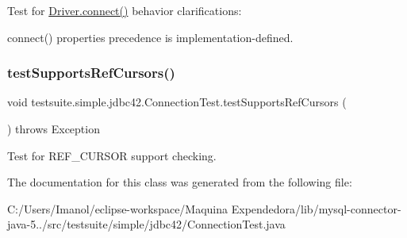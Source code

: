 Test for \mbox{\hyperlink{classcom_1_1mysql_1_1jdbc_1_1_non_registering_driver_a834c012e752a01d1ee435b3461bb8218}{Driver.\+connect()}} behavior clarifications\+:
\begin{DoxyItemize}
\item connect() properties precedence is implementation-\/defined. 
\end{DoxyItemize}\mbox{\label{classtestsuite_1_1simple_1_1jdbc42_1_1_connection_test_a428df5ce2ff1a22453a331c63e6802e5}} 
\subsubsection{\texorpdfstring{test\+Supports\+Ref\+Cursors()}{testSupportsRefCursors()}}
{\footnotesize\ttfamily void testsuite.\+simple.\+jdbc42.\+Connection\+Test.\+test\+Supports\+Ref\+Cursors (\begin{DoxyParamCaption}{ }\end{DoxyParamCaption}) throws Exception}

Test for R\+E\+F\+\_\+\+C\+U\+R\+S\+OR support checking. 

The documentation for this class was generated from the following file\+:\begin{DoxyCompactItemize}
\item 
C\+:/\+Users/\+Imanol/eclipse-\/workspace/\+Maquina Expendedora/lib/mysql-\/connector-\/java-\/5../src/testsuite/simple/jdbc42/Connection\+Test.\+java\end{DoxyCompactItemize}
